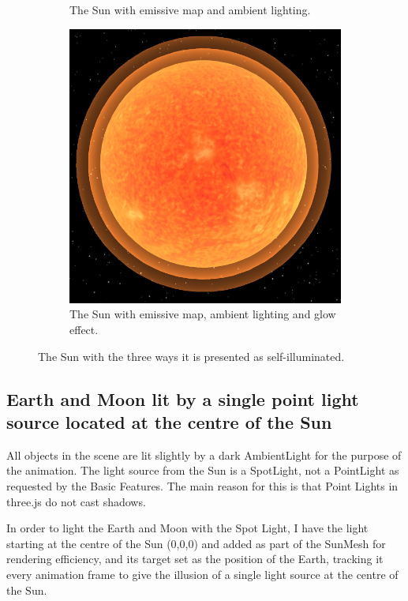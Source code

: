 \documentclass[12pt]{article}
\begin{document}
\begin{figure}[H]
\begin{subfigure}[b]{0.4\textwidth}
                \caption{The Sun with emissive map and ambient lighting.}
                \label{fig:Self-illuminating Sun with emissive map.}
       \end{subfigure}
        \begin{subfigure}[b]{0.4\textwidth}
                \includegraphics[width=\textwidth]{images/sunwithglow}
                \caption{The Sun with emissive map, ambient lighting and glow effect.}
                \label{fig:Self-illuminating Sun with emissive map.}
       \end{subfigure}
        \caption{The Sun with the three ways it is presented as self-illuminated.}\label{fig:Self-illuminated Sun}
\end{figure}

\subsection{Earth and Moon lit by a single point light source located at the centre of the Sun}
All objects in the scene are lit slightly by a dark AmbientLight for the purpose of the animation. The light source from the Sun is a SpotLight, not a PointLight as requested by the Basic Features. The main reason for this is that Point Lights in three.js do not cast shadows. 

In order to light the Earth and Moon with the Spot Light, I have the light starting at the centre of the Sun (0,0,0) and added as part of the SunMesh for rendering efficiency, and its target set as the position of the Earth, tracking it every animation frame to give the illusion of a single light source at the centre of the Sun.
\end{document}
